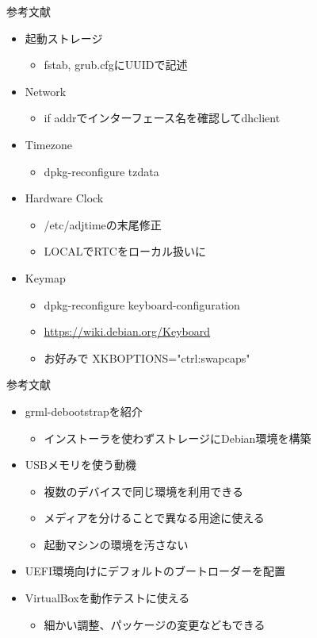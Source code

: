 \begin{frame}[containsverbatim]{参考文献}
  \begin{itemize}
  \item 起動ストレージ
    \begin{itemize}
    \item fstab, grub.cfgにUUIDで記述
    \end{itemize}
  \item Network
    \begin{itemize}
    \item if addrでインターフェース名を確認してdhclient
    \end{itemize}
  \item Timezone
    \begin{itemize}
    \item dpkg-reconfigure tzdata
    \end{itemize}
  \item Hardware Clock
    \begin{itemize}
    \item /etc/adjtimeの末尾修正
    \item LOCALでRTCをローカル扱いに
    \end{itemize}
  \item Keymap
    \begin{itemize}
    \item dpkg-reconfigure keyboard-configuration
    \item \url{https://wiki.debian.org/Keyboard}
    \item お好みで XKBOPTIONS="ctrl:swapcaps"
    \end{itemize}
  \end{itemize}
\end{frame}

\begin{frame}[containsverbatim]{参考文献}
  \begin{itemize}
  \item grml-debootstrapを紹介
    \begin{itemize}
    \item インストーラを使わずストレージにDebian環境を構築
    \end{itemize}
  \item USBメモリを使う動機
    \begin{itemize}
    \item 複数のデバイスで同じ環境を利用できる
    \item メディアを分けることで異なる用途に使える
    \item 起動マシンの環境を汚さない
    \end{itemize}
  \item UEFI環境向けにデフォルトのブートローダーを配置
  \item VirtualBoxを動作テストに使える
    \begin{itemize}
    \item 細かい調整、パッケージの変更などもできる
    \end{itemize}
  \end{itemize}
\end{frame}


